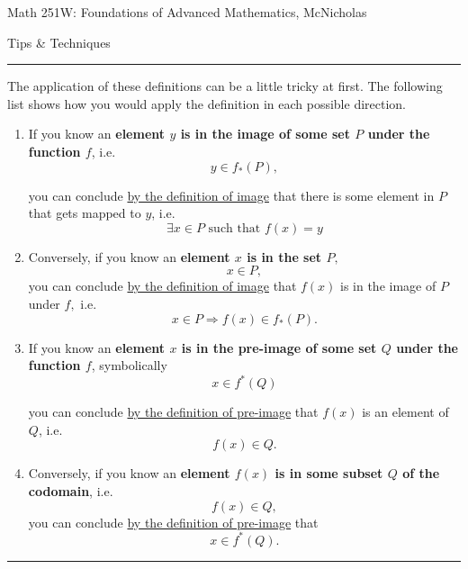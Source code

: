 \documentclass{article}
\begin{document}
	\newpage
	\hfill\tiny{Math 251W: Foundations of Advanced Mathematics, McNicholas}

	\vspace{0.3cm}
	\centerline{\Large{Tips \& Techniques}}
	\vspace{0.3cm}
	\hrule
	\vspace{0.3cm}
	\vspace{.5cm}

	\normalsize
	\medskip

	The application of these definitions can be a little tricky at first. The following list shows how you would apply the definition in each possible direction.
	\begin{enumerate}
		\item If you know an \textbf{element $y$ is in the image of some set $P$ under the function $f$}, i.e. $$y\in f_*(P),$$

		you can conclude \underline{by the definition of image}  that there is some element in $P$ that gets mapped to $y$, i.e. $$\exists x\in P\mbox{ such that } f(x)=y$$
		\item Conversely, if you know an \textbf{element $x$ is in the set $P,$} $$x\in P,$$ you can conclude \underline{by the definition of image} that $f(x)$ is in the image of $P$ under $f,$ i.e.
		$$x\in P \Rightarrow f(x)\in f_*(P).$$
		\item If you know an \textbf{element $x$ is in the pre-image of some set $Q$ under the function $f$}, symbolically $$x\in f^*(Q)$$

		you can conclude \underline{by the definition of pre-image}  that $f(x)$ is an element of $Q$, i.e. $$f(x)\in Q.$$
		\item Conversely, if you know an \textbf{element $f(x)$ is in some subset $Q$ of the codomain}, i.e. $$f(x)\in Q,$$ you can conclude \underline{by the definition of pre-image} that
		$$x\in f^*(Q).$$
	\end{enumerate}

	\vspace{.25cm}
	\hrule

	\vspace{.5cm}
\end{document}
